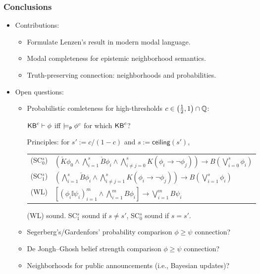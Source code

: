 \begin{frame}
  \frametitle{Conclusions}
  \begin{itemize}
  \item<+-> Contributions:
    \begin{itemize}
    \item Formulate Lenzen's result in modern modal language.

    \item Modal completeness for epistemic neighborhood semantics.

    \item Truth-preserving connection: neighborhoods and
      probabilities.
    \end{itemize}

  \item<+-> Open questions:
    \begin{itemize}
    \item Probabilistic comleteness for high-thresholds
      $c\in\left(\frac 12,1\right)\cap\mathbb{Q}$:
      \begin{center}
        ${\mathsf{KB}}^c\vdash\phi$ iff $\models_{\mathsf{p}}\phi^c$
        for which ${\mathsf{KB}}^c$?
      \end{center}
      Principles: for $s':=c/(1-c)$ and $s:=\textsf{ceiling}(s')$,
      \begin{center}
        \footnotesize
        \renewcommand{\arraystretch}{1.3}
        \begin{tabular}[t]{cl}
          (SC$_0^s$) &
          $\textstyle(\check K\phi_0\land
          \bigwedge_{i=1}^s\check B\phi_i\land
          \bigwedge_{i\neq j=0}^s K(\phi_i\to\lnot \phi_j))\to 
          B(\bigvee_{i=0}^s \phi_i)$
          \\
          (SC$_1^s$) &
          $\textstyle(\bigwedge_{i=1}^s\check B\phi_i\land
          \bigwedge_{i\neq j=1}^s K(\phi_i\to\lnot \phi_j))
          \to B(\bigvee_{i=1}^s \phi_i)$
          \\
          (WL) &
          $\textstyle [(\phi_i\mathbb{I}\psi_i)_{i=1}^m
          \land \bigwedge_{i=1}^m B\phi_i] \to
          \bigvee_{i=1}^m B\psi_i$
        \end{tabular}
      \end{center}
      (WL) sound.  SC$_1^s$ sound if $s\neq s'$, SC$_0^s$ sound if
      $s=s'$.

    \item Segerberg's/Gardenfors' probability comparison
      $\phi\geq\psi$ connection?

    \item De Jongh--Ghosh belief strength comparison $\phi\geq\psi$
      connection?

    \item Neighborhoods for public announcements (i.e., Bayesian
      updates)?
    \end{itemize}
  \end{itemize}
\end{frame}


